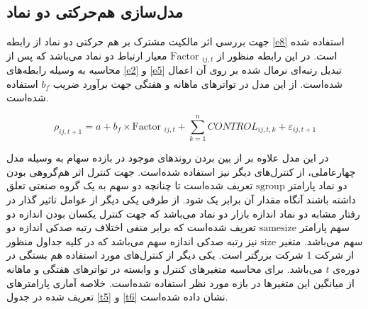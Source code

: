 \documentclass[12pt]{article}
\begin{document}
  \FloatBarrier
  
  
  \subsection{مدل‌سازی هم‌حرکتی دو نماد}
  جهت بررسی اثر مالکیت مشترک بر هم حرکتی دو نماد از رابطه 
  \ref{e8}
  استفاده شده است. در این رابطه منظور از
   $ \text{Factor }_{ij,t} $
    معیار ارتباط دو نماد می‌باشد که پس از محاسبه به وسیله  رابطه‌های 
   \ref{e2}
   و
   \ref{e5}
   تبدیل رتبه‌ای نرمال شده بر روی آن اعمال شده‌است. از این مدل در تواتر‌های ماهانه و هفتگی جهت برآورد ضریب $ b_f $ استفاده شده‌است.
   
  
    \begin{equation}
    \rho_{ij,t+1} = a + b_f \times \text{Factor }_{ij,t} + \sum_{k = 1}^{n } CONTROL_{ij,t,k} + \varepsilon_{ij,t+1}
    \label{e8}
    \end{equation}
  
در این مدل  علاوه بر از بین بردن روند‌های موجود در بازده سهام به وسیله مدل چهارعاملی، از کنترل‌های دیگر نیز استفاده شده‌است.  
جهت کنترل اثر هم‌گروهی بودن دو نماد پارامتر  
  $ \text{sgroup} $
  تعریف شده‌است  تا چنانچه دو سهم به یک گروه صنعتی تعلق داشته باشند آنگاه مقدار آن برابر یک شود. از طرفی یکی دیگر از عوامل تاثیر گذار در رفتار مشابه دو نماد اندازه بازار دو نماد می‌باشد که جهت کنترل یکسان بودن اندازه دو سهم پارامتر
  $ \text{samesize} $
 تعریف شده‌است که برابر منفی اختلاف رتبه صدکی اندازه دو سهم می‌باشد. متغیر 
  $ \text{size} $ 
  نیز رتبه صدکی اندازه سهم می‌باشد که در کلیه جداول منظور از 
  شرکت 1 شرکت بزرگتر است. یکی دیگر از کنترل‌های مورد استفاده هم بستگی در دوره‌ی $ t $ می‌باشد. برای محاسبه متغیر‌های کنترل و وابسته در تواتر‌های هفتگی و ماهانه از میانگین این متغیر‌ها در بازه مورد نظر استفاده شده‌است.
  خلاصه آماری پارامتر‌های تعریف شده در جدول 
  \ref{t5}
  و 
  \ref{t6}
  نشان داده شده‌است.
  
  
  
  
  
  
  
     {\begin{table}[htbp]
       \centering
           \caption{خلاصه آماری پارامتر‌های هفتگی   }
           \label{t5}
     \end{table}} 
\end{document}
